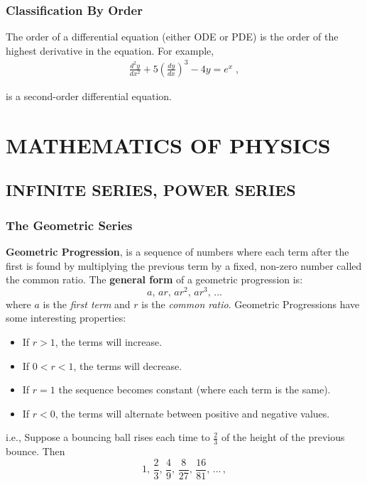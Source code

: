 \documentclass[12pt]{report}
\begin{document}
        \section{Classification By Order}

        \par The order of a differential equation (either ODE or PDE) is the order of the highest derivative in the equation. For example,
        \begin{align*}
            \frac{d^{2}y}{dx^{2}} + 5 \left( \frac{dy}{dx} \right)^3 - 4y = e^{x} \; ,
        \end{align*}
        \par is a second-order differential equation.
    
	
	\part{MATHEMATICS OF PHYSICS}
	
	\chapter{INFINITE SERIES, POWER SERIES}
	
	\section{The Geometric Series}
	\cite{MaryBoas-MathofPhysics-2006}
	
	\par \textbf{Geometric Progression}, is a sequence of numbers where each term after the first is found by multiplying the previous term by a fixed, non-zero number called the common ratio. The \textbf{general form} of a geometric progression is:
	\begin{equation}\label{eq:GP_general-form-1}
		a, \, ar, \, ar^{2}, \, ar^{3}, \, ...
	\end{equation}
	where $a$ is the \textit{first term} and $r$ is the \textit{common ratio}. Geometric Progressions have some interesting properties:
	\begin{itemize}
		\item If $r > 1$, the terms will increase.
		\item If $0 < r < 1$, the terms will decrease.
		\item If $r = 1$ the sequence becomes constant (where each term is the same).
		\item If $r < 0$, the terms will alternate between positive and negative values.
	\end{itemize} 
	i.e., Suppose a bouncing ball rises each time to $\frac{2}{3}$ of the height of the previous bounce. Then	
	\begin{equation}\label{BounceBall-ie1}
		1, \, \frac{2}{3}, \, \frac{4}{9}, \, \frac{8}{27}, \, \frac{16}{81}, \, ... \, ,
	\end{equation}
	
\end{document}
